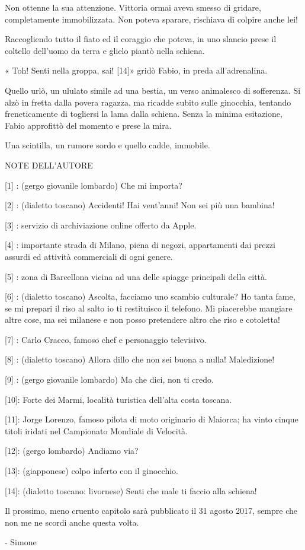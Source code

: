 Non ottenne la sua attenzione. Vittoria ormai aveva smesso di gridare, completamente immobilizzata. Non poteva sparare, rischiava di colpire anche lei!

Raccogliendo tutto il fiato ed il coraggio che poteva, in uno slancio prese il coltello dell'uomo da terra e glielo piantò nella schiena.

« Toh! Senti nella groppa, sai! [14]» gridò Fabio, in preda all'adrenalina.

Quello urlò, un ululato simile ad una bestia, un verso animalesco di sofferenza. Si alzò in fretta dalla povera ragazza, ma ricadde subito sulle ginocchia, tentando freneticamente di togliersi la lama dalla schiena. Senza la minima esitazione, Fabio approfittò del momento e prese la mira.

Una scintilla, un rumore sordo e quello cadde, immobile.

NOTE DELL'AUTORE

[1] : (gergo giovanile lombardo) Che mi importa?

[2] : (dialetto toscano) Accidenti! Hai vent'anni! Non sei più una bambina!

[3] : servizio di archiviazione online offerto da Apple.

[4] : importante strada di Milano, piena di negozi, appartamenti dai prezzi assurdi ed attività commerciali di ogni genere.

[5] : zona di Barcellona vicina ad una delle spiagge principali della città.

[6] : (dialetto toscano) Ascolta, facciamo uno scambio culturale? Ho tanta fame, se mi prepari il riso al salto io ti restituisco il telefono. Mi piacerebbe mangiare altre cose, ma sei milanese e non posso pretendere altro che riso e cotoletta!

[7] : Carlo Cracco, famoso chef e personaggio televisivo.

[8] : (dialetto toscano) Allora dillo che non sei buona a nulla! Maledizione!

[9] : (gergo giovanile lombardo) Ma che dici, non ti credo.

[10]: Forte dei Marmi, località turistica dell'alta costa toscana.

[11]: Jorge Lorenzo, famoso pilota di moto originario di Maiorca; ha vinto cinque titoli iridati nel Campionato Mondiale di Velocità.

[12]: (gergo lombardo) Andiamo via?

[13]: (giapponese) colpo inferto con il ginocchio.

[14]: (dialetto toscano: livornese) Senti che male ti faccio alla schiena!

Il prossimo, meno cruento capitolo sarà pubblicato il 31 agosto 2017, sempre che non me ne scordi anche questa volta.

- Simone




